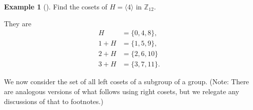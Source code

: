 \documentclass[10pt,]{book}
\theoremstyle{plain}
\theoremstyle{definition}
\theoremstyle{definition}
\theoremstyle{definition}
\newtheorem{example}[theorem]{Example}
\theoremstyle{definition}
\numberwithin{equation}{section}
\def\Z{\mathbb{Z}}
\newcommand{\amp}{&}
\begin{document}
\begin{example}[]\label{z6_ex}
Find the cosets of \(H=\langle 4\rangle\) in \(\Z_{12}\).%
\par
They are%
\begin{align*}
H\amp =\{0,4,8\},\\
1+H \amp = \{1,5,9\},\\
2+H\amp =\{2,6,10\}\\
3+H\amp =\{3,7,11\}.
\end{align*}
%
\end{example}
We now consider the set of all left cosets of a subgroup of a group. (Note: There are analogous versions of what follows using right cosets, but we relegate any discussions of that to footnotes.)%
\label{notation-28}
\typeout{************************************************}
\typeout{************************************************}
\end{document}

